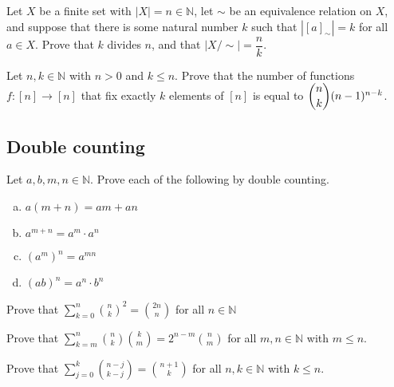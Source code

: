 \begin{chapex}
Let $X$ be a finite set with $|X| = n \in \mathbb{N}$, let $\sim$ be an equivalence relation on $X$, and suppose that there is some natural number $k$ such that $|[a]_{\sim}| = k$ for all $a \in X$. Prove that $k$ divides $n$, and that $|X/{\sim}| = \dfrac{n}{k}$.
\end{chapex}

\begin{chapex}
Let $n,k \in \mathbb{N}$ with $n>0$ and $k \le n$. Prove that the number of functions $f : [n] \to [n]$ that fix exactly $k$ elements of $[n]$ is equal to $\dbinom{n}{k}(n-1)^{n-k}$.
\end{chapex}

\subsection*{Double counting}

\begin{chapex}
Let $a,b,m,n \in \mathbb{N}$. Prove each of the following by double counting.
\begin{multicols}{2}
\begin{enumerate}[(a)]
\item $a(m+n) = am + an$
\item $a^{m+n} = a^m \cdot a^n$
\item $(a^m)^n = a^{mn}$
\item $(ab)^n = a^n \cdot b^n$
\end{enumerate}
\end{multicols}
\end{chapex}

\begin{chapex}
Prove that $\displaystyle \sum_{k=0}^n \binom{n}{k}^2 = \binom{2n}{n}$ for all $n \in \mathbb{N}$
\end{chapex}

\begin{chapex}
Prove that $\displaystyle \sum_{k=m}^n \binom{n}{k} \binom{k}{m} = 2^{n-m} \binom{n}{m}$ for all $m,n \in \mathbb{N}$ with $m \le n$.
\end{chapex}

\begin{chapex}
Prove that $\displaystyle \sum_{j=0}^k \binom{n-j}{k-j} = \binom{n+1}{k}$ for all $n,k \in \mathbb{N}$ with $k \le n$.
\end{chapex}

